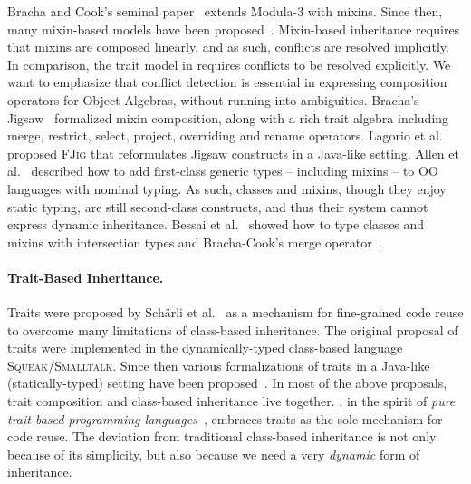 Bracha and Cook's seminal paper~\citep{bracha1990mixin} extends Modula-3 with
mixins. Since then, many mixin-based models have been proposed~\citep{flatt1998classes,bono1999core, ancona2003jam}.
Mixin-based inheritance requires that mixins are composed linearly, and
as such, conflicts are resolved implicitly. In comparison, the trait
model in \name requires conflicts to be resolved explicitly. We want to emphasize
that conflict detection is essential in expressing composition operators
for Object Algebras, without running into ambiguities. Bracha's
Jigsaw~\citep{bracha1992programming} formalized mixin composition, along with a rich
trait algebra including merge, restrict, select, project, overriding and rename operators.
Lagorio et al.~\citep{LAGORIO201286} proposed \textsc{FJig} that reformulates Jigsaw constructs
in a Java-like setting.
Allen et al.~\citep{DBLP:conf/oopsla/AllenBC03} described how to add first-class generic
types -- including mixins -- to OO languages with nominal typing.
As such, classes and mixins, though they enjoy static typing, are still second-class
constructs, and thus their system cannot express dynamic inheritance. Bessai et
al.~\citep{DBLP:journals/corr/BessaiDDCd15} showed how to type classes and mixins
with intersection types and Bracha-Cook's merge operator~\citep{bracha1990mixin}.


\paragraph{Trait-Based Inheritance.}


Traits were proposed by Sch{\"a}rli et al.~\citep{scharli2003traits, Ducasse_2006} as a mechanism
for fine-grained code reuse to overcome many limitations of class-based inheritance. The original proposal
of traits were implemented in the dynamically-typed class-based language \textsc{Squeak/Smalltalk}.
Since then various formalizations of traits in a Java-like (statically-typed) setting
have been proposed~\citep{fisher2004typed,scharli2003traitsformal,chai_trait, JOT:issue_2006_05/article4}.
In most of the above proposals, trait composition and class-based inheritance live together.
\name, in the spirit of \textit{pure trait-based programming languages}~\citep{BETTINI2013521, BETTINI2017419}, embraces
traits as the sole mechanism for code reuse.
The deviation from traditional class-based inheritance is not only
because of its simplicity, but also because we need a very \emph{dynamic} form
of inheritance.

